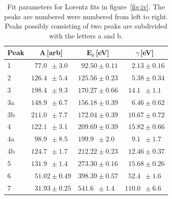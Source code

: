 \documentclass[a4paper,10pt]{scrartcl}
\begin{document}
\begin{table}
\begin{center}
\begin{tabular}{lccc}
\toprule
Peak & A\,[arb]                                        & E$_{0}$\,[eV]                         & $\gamma$\,[eV]                                  \\
\midrule 
1    & $\phantom{0}77.0\phantom{0} \pm 3.0\phantom{0}$ & $\phantom{0}92.50 \pm 0.11$           & $\phantom{00}2.13 \pm 0.16$                     \\
2    & $126.4\phantom{0} \pm 5.4\phantom{0}$           & $125.56 \pm 0.23$                     & $\phantom{00}5.38 \pm 0.34$                     \\
3    & $198.4\phantom{0} \pm 9.3\phantom{0}$           & $170.27 \pm 0.66$                     & $\phantom{0}14.1\phantom{0} \pm 1.1\phantom{0}$ \\
3a   & $148.9\phantom{0} \pm 6.7\phantom{0}$           & $156.18 \pm 0.39$                     & $\phantom{00}6.46 \pm 0.62$                     \\
3b   & $211.0\phantom{0} \pm 7.7\phantom{0}$           & $172.04 \pm 0.39$                     & $\phantom{0}10.67 \pm 0.72$                     \\
4    & $122.1\phantom{0} \pm 3.1\phantom{0}$           & $209.69 \pm 0.39$                     & $\phantom{0}15.82 \pm 0.66$                     \\
4a   & $\phantom{0}98.9\phantom{0} \pm 8.5\phantom{0}$ & $199.9\phantom{0} \pm 2.0\phantom{0}$ & $\phantom{00}9.1\phantom{0} \pm 1.7\phantom{0}$ \\
4b   & $124.7\phantom{0} \pm 1.7\phantom{0}$           & $212.22 \pm 0.23$                     & $\phantom{0}12.46 \pm 0.37$                     \\
5    & $131.9\phantom{0} \pm 1.4\phantom{0}$           & $273.30 \pm 0.16$                     & $\phantom{0}15.68 \pm 0.26$                     \\
6    & $\phantom{0}51.02 \pm 0.49$                     & $398.39 \pm 0.57$                     & $\phantom{0}52.4\phantom{0} \pm 1.6\phantom{0}$ \\
7    & $\phantom{0}31.93 \pm 0.25$                     & $541.6\phantom{0} \pm 1.4\phantom{0}$ & $110.0\phantom{0} \pm 6.6\phantom{0}$           \\  
\bottomrule
\end{tabular}
\end{center}
\par
\caption{Fit parameters for Lorentz fits in figure~\ref{fig:iv}. The peaks are numbered were numbered from left to right. Peaks possibly consisting of two peaks are subdivided with the letters a and b. \label{tab:lorentz}}
\end{table}
\end{document}

